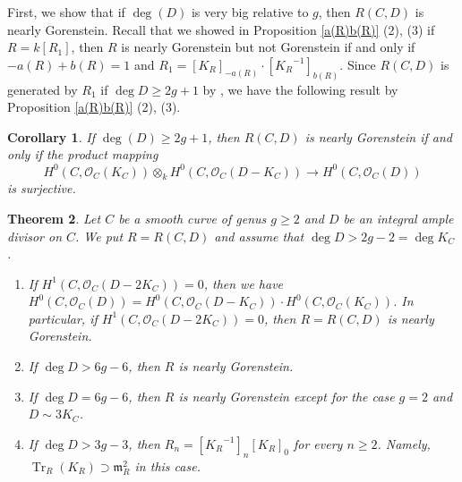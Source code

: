 \documentclass[12pt]{amsart}
\newtheorem{thm}{Theorem}[section]
\newtheorem{cor}[thm]{Corollary}
\theoremstyle{definition}
\theoremstyle{remark}
\numberwithin{equation}{section}
\DeclareMathOperator{\Tr}{Tr}
\newcommand{\m}{\mathfrak m}
\newcommand{\KiR}{{K_R}^{-1}}
\newcommand{\cO}{\mathcal O}
\renewcommand{\:}{\colon}
\begin{document}
\par 
First, we show that if $\deg(D)$ is very big relative to $g$, then $R(C,D)$ is nearly 
Gorenstein. Recall that we showed in 
Proposition \ref{a(R)b(R)} (2), (3) if $R=k[R_1]$,  
then $R$ is nearly Gorenstein but not Gorenstein if and only if 
$-a(R)+b(R)=1$ and 
 $R_1= [K_R]_{-a(R)}\cdot [\KiR]_{b(R)}$. 
Since $R(C,D)$ is generated by $R_1$ if $\deg D\ge 2g+1$ by \cite{Mum}, 
we have the following result by Proposition \ref{a(R)b(R)} (2), (3).


\begin{cor}\label{ge 2g+1} If $\deg(D)\ge 2g+1$, then $R(C,D)$ is nearly Gorenstein 
if and only if the product mapping 
\[H^0(C, \cO_C(K_C))\otimes_k H^0(C, \cO_C(D - K_C)) \to H^0(C, \cO_C(D))\]
is surjective. 
\end{cor} 
  
\begin{thm}\label{high-deg} 
Let $C$ be a smooth curve of genus $g\ge 2$ and 
$D$ be an integral ample divisor on $C$. 
We put $R = R(C,D)$ and assume 
that $\deg D > 2g -2 = \deg K_C$.
\par
\begin{enumerate}
\item If $H^1(C, \cO_C(D - 2 K_C))=0$, then 
we have $H^0(C, \cO_C(D))= H^0(C, \cO_C(D-K_C))\cdot H^0(C, \cO_C(K_C))$.
In particular, if $H^1(C, \cO_C(D - 2 K_C))=0$, then $R=R(C,D)$ is nearly Gorenstein.  
\item If $\deg D > 6g -6$, then $R$ is nearly Gorenstein. 
\item If $\deg D = 6g-6$, then $R$ is nearly Gorenstein except for the 
case $g=2$ and $D \sim 3K_C$. 
\item If $\deg D > 3g -3$, then $R_n = [\KiR]_n [K_R]_0$ for every $n\ge 2$. 
Namely, $\Tr_R(K_R) \supset \m_R^2$ in this case.  
\end{enumerate}
\end{thm} 
\end{document}
